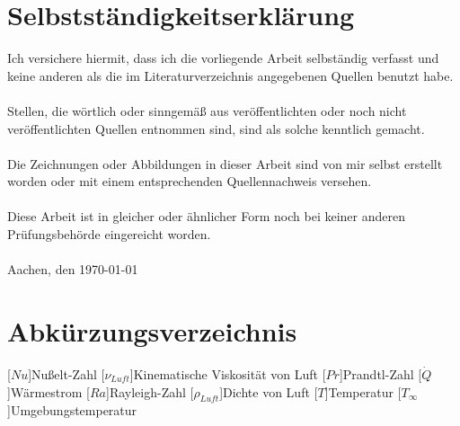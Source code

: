 \documentclass[a4paper,12pt]{scrreprt}
\begin{document}
\chapter*{Selbstständigkeitserklärung}
\thispagestyle{empty}	%
Ich versichere hiermit, dass ich die vorliegende Arbeit selbständig verfasst und keine anderen als die im Literaturverzeichnis angegebenen Quellen benutzt habe.\\ \\
Stellen, die wörtlich oder sinngemäß aus veröffentlichten oder noch nicht veröffentlichten Quellen entnommen sind, sind als solche kenntlich gemacht.\\ \\ Die Zeichnungen oder Abbildungen in dieser Arbeit sind von mir selbst erstellt worden oder mit einem entsprechenden Quellennachweis versehen.\\ \\ Diese Arbeit ist in gleicher oder ähnlicher Form noch bei keiner anderen Prüfungsbehörde eingereicht worden.\\ \\[2ex]
Aachen, den \today \hspace{4cm} \dotfill 
\tableofcontents

\clearpage
\chapter*{Abkürzungsverzeichnis}\label{abkuerzungsverzeichnis}
\begin{acronym}[YTM]
\setlength{\itemsep}{-\parsep}

[$Nu$]{\hspace{1cm}Nußelt-Zahl}
[$\nu_{Luft}$]{\hspace{1cm}Kinematische Viskosität von Luft}
[$Pr$]{\hspace{1cm}Prandtl-Zahl}
[$\dot Q$]{\hspace{1cm}Wärmestrom}
[$Ra$]{\hspace{1cm}Rayleigh-Zahl}
[$\rho_{Luft}$]{\hspace{1cm}Dichte von Luft}
[$T$]{\hspace{1cm}Temperatur}
[$T_{\infty}$]{\hspace{1cm}Umgebungstemperatur}

\end{acronym}
\end{document}

